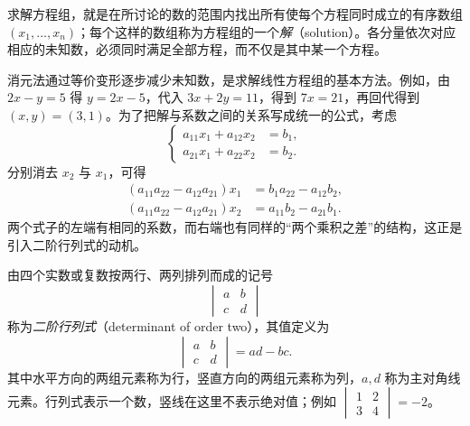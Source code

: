 求解方程组，就是在所讨论的数的范围内找出所有使每个方程同时成立的有序数组 $(x_1,\ldots,x_n)$；每个这样的数组称为方程组的一个\emph{解}（solution）。各分量依次对应相应的未知数，必须同时满足全部方程，而不仅是其中某一个方程。


消元法通过等价变形逐步减少未知数，是求解线性方程组的基本方法。例如，由 $2x-y=5$ 得 $y=2x-5$，代入 $3x+2y=11$，得到 $7x=21$，再回代得到 $(x,y)=(3,1)$。为了把解与系数之间的关系写成统一的公式，考虑
\[
    \left\{
    \begin{aligned}
        a_{11}x_1+a_{12}x_2&=b_1,\\
        a_{21}x_1+a_{22}x_2&=b_2.
    \end{aligned}
    \right.
\]
分别消去 $x_2$ 与 $x_1$，可得
\[
    \begin{aligned}
        (a_{11}a_{22}-a_{12}a_{21})x_1&=b_1a_{22}-a_{12}b_2,\\
        (a_{11}a_{22}-a_{12}a_{21})x_2&=a_{11}b_2-a_{21}b_1.
    \end{aligned}
\]
两个式子的左端有相同的系数，而右端也有同样的“两个乘积之差”的结构，这正是引入二阶行列式的动机。

\begin{definition}
\label{def:determinant-order-two}
由四个实数或复数按两行、两列排列而成的记号
\[
    \begin{vmatrix}a&b\\c&d\end{vmatrix}
\]
称为\emph{二阶行列式}（determinant of order two），其值定义为
\[
    \begin{vmatrix}a&b\\c&d\end{vmatrix}=ad-bc.
\]
其中水平方向的两组元素称为行，竖直方向的两组元素称为列，$a,d$ 称为主对角线元素。行列式表示一个数，竖线在这里不表示绝对值；例如 $\begin{vmatrix}1&2\\3&4\end{vmatrix}=-2$。
\end{definition}

